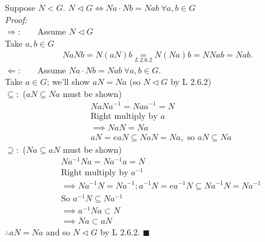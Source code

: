 \begin{lemma}
Suppose $N<G$. $N\triangleleft G \iff Na\cdot Nb = N{ab} \ \forall a,b \in G$ \steezybreak\\
\textit{Proof:} \steezybreak\\
$\Rightarrow :$  \ \ \ Assume $N\triangleleft G$\steezybreak\\
Take $a,b\in G$
\begin{align}
    NaNb=N(aN)b \underset{L \ 2.6.2}{=}N(Na)b=NNab = Nab .\nonumber
\end{align}
$\Leftarrow :$ \ \ \ Assume $Na\cdot Nb=Nab \ \forall a,b\in G.$\steezybreak\\
Take $a\in G$; we'll show $aN=Na$ (so $N\triangleleft G$ by L 2.6.2)\steezybreak\\
$\subseteq :$ ($aN\subseteq Na$ must be shown)
\begin{align}
    &NaNa^{-1}=Naa^{-1}=N \nonumber\\
    &\text{Right multiply by } a \nonumber\\
    &\implies NaN=Na \nonumber \\
    &aN=eaN\subseteq NaN=Na , \text{ so } aN\subseteq Na \nonumber
\end{align}
$\supseteq :$ ($Na\subseteq aN$ must be shown)\steezybreak\\
\begin{align}
    &Na^{-1}Na=Na^{-1}a=N \nonumber \\
    &\text{Right multiply by } a^{-1} \nonumber\\
    &\implies Na^{-1}N=Na^{-1}; a^{-1}N=ea^{-1}N\subseteq Na^{-1}N=Na^{-1} \nonumber \\
    &\text{So } a^{-1}N\subseteq Na^{-1} \nonumber \\
    &\implies a^{-1}Na\subset N \nonumber \\
    &\implies Na\subset aN \nonumber
\end{align}
$\therefore aN=Na$ and so $N\triangleleft G$ by L 2.6.2. $\blacksquare$
\end{lemma}
